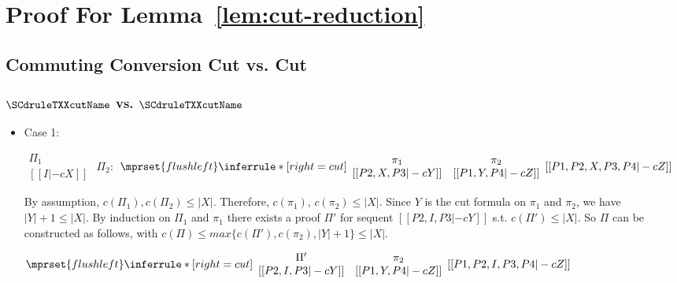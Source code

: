 \section{Proof For Lemma~\ref{lem:cut-reduction}}
\label{app:cut-reduction}


\subsection{Commuting Conversion Cut vs. Cut}

\subsubsection{$\SCdruleTXXcutName$ vs. $\SCdruleTXXcutName$}
\begin{itemize}
\item Case 1:
      \begin{center}
        \scriptsize
        \begin{math}
          \begin{array}{c}
            \Pi_1 \\
            {[[I |-c X]]}
          \end{array}
        \end{math}
        \qquad\qquad
        $\Pi_2:$
        \begin{math}
          $$\mprset{flushleft}
          \inferrule* [right={\tiny cut}] {
            {
              \begin{array}{cc}
                \pi_1 & \pi_2 \\
                {[[P2, X, P3 |-c Y]]} & {[[P1, Y, P4 |-c Z]]}
              \end{array}
            }
          }{[[P1, P2, X, P3, P4 |-c Z]]}
        \end{math}
      \end{center}
      By assumption, $c(\Pi_1),c(\Pi_2)\leq |X|$. Therefore, $c(\pi_1)$,
      $c(\pi_2)\leq |X|$. Since $Y$ is the cut formula on $\pi_1$ and
      $\pi_2$, we have $|Y|+1\leq|X|$. By induction on $\Pi_1$ and $\pi_1$
      there exists a proof $\Pi'$ for sequent $[[P2, I, P3 |-c Y]]$ s.t.
      $c(\Pi')\leq|X|$. So $\Pi$ can be constructed as follows, with
      $c(\Pi)\leq max\{c(\Pi'),c(\pi_2),|Y|+1\}\leq |X|$.
      \begin{center}
        \scriptsize
        \begin{math}
          $$\mprset{flushleft}
          \inferrule* [right={\tiny cut}] {
            {
              \begin{array}{cc}
                \Pi' & \pi_2 \\
                {[[P2, I, P3 |-c Y]]} & {[[P1, Y, P4 |-c Z]]}
              \end{array}
            }
          }{[[P1, P2, I, P3, P4 |-c Z]]}
        \end{math}
      \end{center}


\end{itemize}
